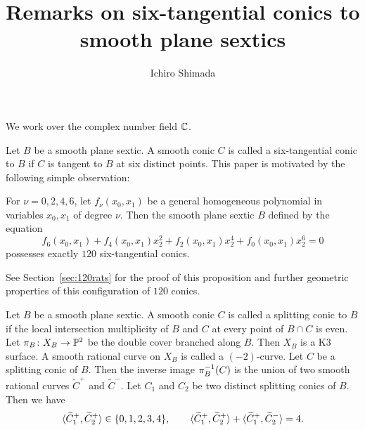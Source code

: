 \documentclass{amsart} %
\newcommand{\ps}{B}
\newcommand{\con}{C}
\newcommand{\wtcon}{\widetilde{\con}}
\newcommand{\pips}{\pi_{\ps}}
\newcommand{\Xps}{X_{\ps}}
\begin{document}
%
\title{Remarks on  six-tangential conics to smooth plane sextics} 
\author{Ichiro Shimada}
\address{Department of Mathematics,
Graduate School of Science,
Hiroshima University,
1-3-1 Kagamiyama,
Higashi-Hiroshima,
739-8526 JAPAN}
%
%

%
\begin{abstract}
\end{abstract}
%
\keywords{}
\maketitle

We work over the complex number field $\mathord{\mathbb{C}}$.
\par
%
Let $\ps$ be a smooth plane sextic.
A smooth conic $\con$ is called a six-tangential conic to $\ps$
if $\con$ is tangent to $\ps$ at six distinct  points.
This paper is motivated by the following  simple  observation:
%
\begin{proposition}\label{prop:120rats}
For $\nu=0,2,4,6$,
let $f_{\nu} (x_0, x_1)$ be a general  homogeneous polynomial in variables $x_0, x_1$ of degree $\nu$.
Then the smooth plane sextic $\ps$ defined by the equation 
%
\begin{equation}\label{eq:iotainvsextic}
f_6(x_0, x_1) +f_4(x_0, x_1) x_2^2 + f_2(x_0, x_1) x_2^4 + f_0(x_0, x_1) x_2^6=0
\end{equation}
%
possesses exactly $120$ six-tangential conics.
\end{proposition}
%
See Section~\ref{sec:120rats} for the proof of this proposition and 
further geometric properties of this configuration of $120$ conics.
%
\par
%
Let $\ps$ be a smooth plane sextic.
A smooth conic $\con$ is called a splitting  conic to $\ps$
if the local intersection multiplicity of $\ps$ and $\con$ at every point of
$\ps\cap\con$ is even.
%
%
Let $\pips\colon\Xps\to\PP^2$ be the double cover branched along $\ps$.
Then $\Xps$ is a K3 surface.
A smooth rational curve on $\Xps$ is called a $(-2)$-curve.
Let $\con$ be a splitting conic of $\ps$.
Then 
the inverse image 
$\pips\inv (\con)$
 is the union of two smooth rational curves 
$\wtcon^+$ and $\wtcon^-$.
Let $\con_1$ and $\con_2$ be two distinct splitting conics of  $\ps$.
Then we have
\[
\intf{\wtcon_1^+, \wtcon_2^+}\in \{0,1,2,3,4\},
\qquad 
\intf{\wtcon_1^+, \wtcon_2^+}+\intf{\wtcon_1^+, \wtcon_2^-}=4.
\]
\end{document}
